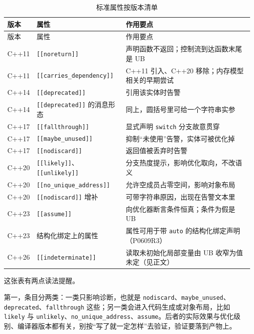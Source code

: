 \documentclass[12pt,a4paper,fontset=fandol]{ctexbook}
\newcommand{\cpp}[1]{C++#1}
\newcommand{\kw}[1]{\texttt{#1}}
\begin{document}
{\footnotesize
\begin{longtable}{@{}>{\raggedright\arraybackslash}p{}>{\raggedright\arraybackslash}p{}>{\raggedright\arraybackslash}p{}@{}}
\caption{标准属性按版本清单}\label{tab:ch2-list}\\
\toprule
版本 & 属性 & 作用要点 \\ \midrule
\endfirsthead
\toprule
版本 & 属性 & 作用要点 \\ \midrule
\endhead
\bottomrule
\endfoot
\cpp{11} & \texttt{[[noreturn]]} & 声明函数不返回；控制流到达函数末尾是 UB \\
\cpp{11} & \texttt{[[carries\_dependency]]} & \cpp{11} 引入、\cpp{20} 移除；内存模型相关的早期尝试 \\
\cpp{14} & \texttt{[[deprecated]]} & 引用该实体时告警 \\
\cpp{14} & \texttt{[[deprecated]]} 的消息形态 & 同上，圆括号里可给一个字符串实参 \\
\cpp{17} & \texttt{[[fallthrough]]} & 显式声明 \texttt{switch} 分支故意贯穿 \\
\cpp{17} & \texttt{[[maybe\_unused]]} & 抑制“未使用”告警，实体可被优化掉 \\
\cpp{17} & \texttt{[[nodiscard]]} & 返回值被丢弃时告警 \\
\cpp{20} & \texttt{[[likely]]}、\texttt{[[unlikely]]} & 分支热度提示，影响优化取向，不改语义 \\
\cpp{20} & \texttt{[[no\_unique\_address]]} & 允许空成员占零空间，影响对象布局 \\
\cpp{20} & \texttt{[[nodiscard]]} 增补 & 可带字符串原因，出现在告警文本里 \\
\cpp{23} & \texttt{[[assume]]} & 向优化器断言条件恒真；条件为假是 UB \\
\cpp{23} & 结构化绑定上的属性 & 属性可用于带 \kw{auto} 的结构化绑定声明（P0609R3） \\
\cpp{26} & \texttt{[[indeterminate]]} & 读取未初始化局部变量由 UB 收窄为值未定（见正文） \\
\end{longtable}}

这张表有两点读法提醒。

第一，条目分两类：一类只影响诊断，也就是 \texttt{nodiscard}、\texttt{maybe\_unused}、\texttt{deprecated}、\texttt{fallthrough} 这些；另一类会进入代码生成或对象布局，比如 \texttt{likely} 与 \texttt{unlikely}、\texttt{no\_unique\_address}、\texttt{assume}。后者的实际效果与优化级别、编译器版本都有关，别按“写了就一定怎样”去验证，验证要落到产物上。
\end{document}
